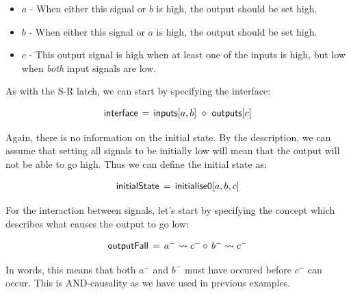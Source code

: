 \documentclass[british,conference,compsoc]{IEEEtran}
\begin{document}
\begin{itemize}
  \item $a$ - When either this signal or $b$ is high, the output should be set high.
  \item $b$ - When either this signal or $a$ is high, the output should be set high.
  \item $c$ - This output signal is high when at least one of the inputs is high, but low when
		\emph{both} input signals are low.
\end{itemize}

As with the S-R latch, we can start by specifying the interface: 


\[
\begin{array}{lcl}
\mathsf{interface}&\hspace{-2mm}=&\hspace{-2mm}\mathsf{inputs}[a, b]~\diamond~\mathsf{outputs}[c]
\end{array}
\]

\noindent Again, there is no information on the initial state. By the description, we can
assume that setting all signals to be initially low will mean that the output
will not be able to go high. Thus we can define the initial state as:


\[
\begin{array}{lcl}
\mathsf{initialState}&\hspace{-2mm}=&\hspace{-2mm}\mathsf{initialise0} [a, b, c]
\end{array}
\]

\noindent For the interaction between signals, let's start by specifying the concept which 
describes what causes the output to go low:

\[
\begin{array}{lcl}
\mathsf{outputFall}&\hspace{-2mm}=&\hspace{-2mm}a^{-} \rightsquigarrow c^{-} \diamond\, b^{-} \rightsquigarrow c^{-}
\end{array}
\]

\noindent In words, this means that both $a^{-}$ and $b^{-}$ must have occured before $c^{-}$ can occur. 
This is AND-causality as we have used in previous examples. 
\end{document}
